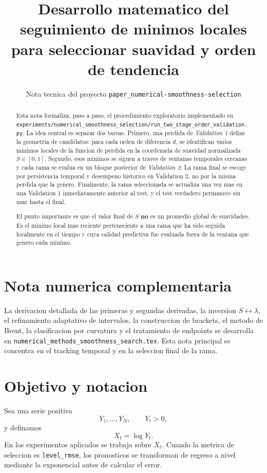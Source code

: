 \documentclass[11pt]{article}
\title{Desarrollo matematico del seguimiento de minimos locales\\
para seleccionar suavidad y orden de tendencia}
\author{Nota tecnica del proyecto \texttt{paper\_numerical-smoothness-selection}}
\date{}
\begin{document}
\maketitle

\begin{abstract}
Esta nota formaliza, paso a paso, el procedimiento exploratorio implementado en
\texttt{experiments/numerical\_smoothness\_selection/run\_two\_stage\_order\_validation.py}.
La idea central es separar dos tareas. Primero, una perdida de
\emph{Validation 1} define la geometria de candidatos: para cada orden de
diferencia \(d\), se identifican varios minimos locales de la funcion de
perdida en la coordenada de suavidad normalizada \(S\in[0,1]\). Segundo, esos
minimos se siguen a traves de ventanas temporales cercanas y cada rama se
evalua en un bloque posterior de \emph{Validation 2}. La rama final se escoge
por persistencia temporal y desempeno historico en Validation 2, no por la
misma perdida que la genero. Finalmente, la rama seleccionada se actualiza una
vez mas en una Validation 1 inmediatamente anterior al test, y el test
verdadero permanece sin usar hasta el final.

El punto importante es que el valor final de \(S\) \textbf{no} es un promedio
global de suavidades. Es el minimo local mas reciente perteneciente a una rama
que ha sido seguida localmente en el tiempo y cuya calidad predictiva fue
evaluada fuera de la ventana que genero cada minimo.
\end{abstract}

\tableofcontents

\section*{Nota numerica complementaria}
La derivacion detallada de las primeras y segundas derivadas, la inversion
\(S\leftrightarrow\lambda\), el refinamiento adaptativo de intervalos, la
construccion de brackets, el metodo de Brent, la clasificacion por curvatura y
el tratamiento de endpoints se desarrolla en
\texttt{numerical\_methods\_smoothness\_search.tex}. Esta nota principal se
concentra en el tracking temporal y en la seleccion final de la rama.

\section{Objetivo y notacion}

Sea una serie positiva
\[
Y_1,\ldots,Y_N,\qquad Y_t>0,
\]
y definamos
\[
X_t=\log Y_t.
\]
En los experimentos aplicados se trabaja sobre \(X_t\). Cuando la metrica de
seleccion es \texttt{level\_rmse}, los pronosticos se transforman de regreso a
nivel mediante la exponencial antes de calcular el error.
\end{document}
